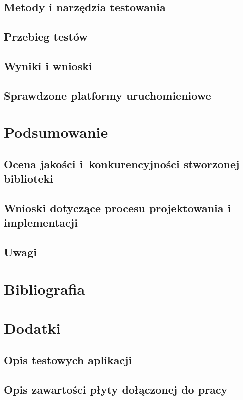 \documentclass[11pt,twoside,a4paper,final]{llncs}
\begin{document}
\subsection{Metody i narzędzia testowania}
\subsection{Przebieg testów}
\subsection{Wyniki i wnioski}
\subsection{Sprawdzone platformy uruchomieniowe\newline}

\section{Podsumowanie}
\subsection{Ocena jakości i~konkurencyjności stworzonej biblioteki}
\subsection{Wnioski dotyczące procesu projektowania i implementacji}
\subsection{Uwagi\newline}

\section{Bibliografia\newline}

\section{Dodatki}
\subsection{Opis testowych aplikacji}
\subsection{Opis zawartości płyty dołączonej do pracy}
\end{document}
